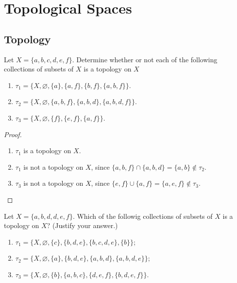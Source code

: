 \chapter{Topological Spaces}

\section{Topology}

\begin{exercise}
    Let $X = \{ a, b, c, d, e, f \}$. Determine whether or not each of the following collections of subsets of $X$ is a topology on $X$
    \begin{enumerate}[label={(\alph*)}]
        \item $\tau_{1} = \{ X, \varnothing, \{ a \}, \{ a, f \}, \{ b, f \}, \{ a, b, f \} \}$.
        \item $\tau_{2} = \{ X, \varnothing, \{ a, b, f \}, \{ a, b, d \}, \{ a, b, d, f \} \}$.
        \item $\tau_{3} = \{ X, \varnothing, \{ f \}, \{ e, f \}, \{ a, f \} \}$.
    \end{enumerate}
\end{exercise}

\begin{proof}
    \begin{enumerate}[label={(\alph*)}]
        \item $\tau_{1}$ is a topology on $X$.
        \item $\tau_{1}$ is not a topology on $X$, since $\{ a, b, f \}\cap\{ a, b, d \} = \{ a, b \}\notin \tau_{2}$.
        \item $\tau_{3}$ is not a topology on $X$, since $\{ e, f \}\cup\{ a, f \} = \{ a, e, f \}\notin \tau_{3}$.
    \end{enumerate}
\end{proof}
\newpage

\begin{exercise}
    Let $X = \{ a, b, d, d, e, f \}$. Which of the followig collections of subsets of $X$ is a topology on $X$? (Justify your answer.)
    \begin{enumerate}[label={(\alph*)}]
        \item $\tau_{1} = \{ X, \varnothing, \{ c \}, \{ b, d, e \}, \{ b, c, d, e \}, \{ b \} \}$;
        \item $\tau_{2} = \{ X, \varnothing, \{ a \}, \{ b, d, e \}, \{ a, b, d \}, \{ a, b, d, e \} \}$;
        \item $\tau_{3} = \{ X, \varnothing, \{ b \}, \{ a, b, c \}, \{ d, e, f \}, \{ b, d, e, f \} \}$.
    \end{enumerate}
\end{exercise}

